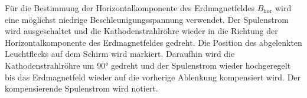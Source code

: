 Für die Bestimmung der Horizontalkomponente des Erdmagnetfeldes $B_{\mathrm{hor}}$ wird eine
möglichst niedrige Beschleunigungsspannung verwendet.
Der Spulenstrom wird ausgeschaltet und die Kathodenstrahlröhre wieder in die Richtung der
Horizontalkomponente des Erdmagnetfeldes gedreht. Die Position des abgelenkten Leuchtflecks
auf dem Schirm wird markiert. Daraufhin wird die Kathodenstrahlröhre um $90°$ gedreht und
der Spulenstrom wieder hochgeregelt bis das Erdmagnetfeld wieder auf die vorherige Ablenkung
kompensiert wird. Der kompensierende Spulenstrom wird notiert.
